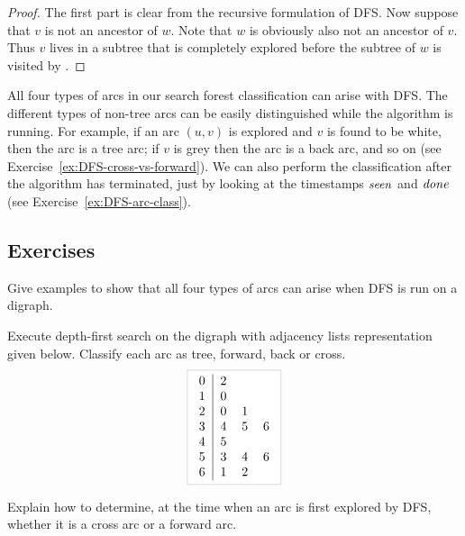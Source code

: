 \begin{proof} The first part is clear from the recursive formulation
of DFS. Now suppose that $v$ is not an ancestor of $w$. Note that $w$
is obviously also not an ancestor of $v$. 
Thus $v$ lives in a subtree that is completely explored before the 
subtree of $w$ is visited by .
\end{proof}

All four types of arcs in our search forest classification can
arise with DFS. The different types of non-tree arcs can be easily
distinguished while the algorithm is running. For example, if an arc
$(u, v)$ is explored and $v$ is found to be white, then the arc is a
tree arc; if $v$ is grey then the arc is a back arc, and so on (see
Exercise~\ref{ex:DFS-cross-vs-forward}). We can also perform the classification 
after the algorithm has terminated, just by looking at the timestamps 
$\operatorname{\text{\textit{seen}}}$ and $\operatorname{\text{\textit{done}}}$ (see Exercise~\ref{ex:DFS-arc-class}).

\subsection*{Exercises}

\begin{Exercise} 
\label{ex:DFS-all-arcs-occur}
Give examples to show that all four types of arcs can arise when DFS is
run on a digraph.
\end{Exercise}

\begin{Exercise}
\label{ex:DFS-doDFS}

Execute depth-first search on the digraph with adjacency lists
representation  given below. Classify each arc as tree, forward, back or cross.
\newline
$$
\lightgraybox{
	\begin{tabular}{c|cccc}
		0 & 2 &   &   \\
		1 & 0 &   &   \\
		2 & 0 & 1 &   \\
		3 & 4 & 5 & 6 \\
		4 & 5 &   &   \\
		5 & 3 & 4 & 6 \\
		6 & 1 & 2 &   \\
	\end{tabular}
}
$$
\end{Exercise}

\begin{Exercise}
\label{ex:DFS-cross-vs-forward}
Explain how to determine, at the time when an arc is first explored by
DFS, whether it is a cross arc or a forward arc.
\end{Exercise}

